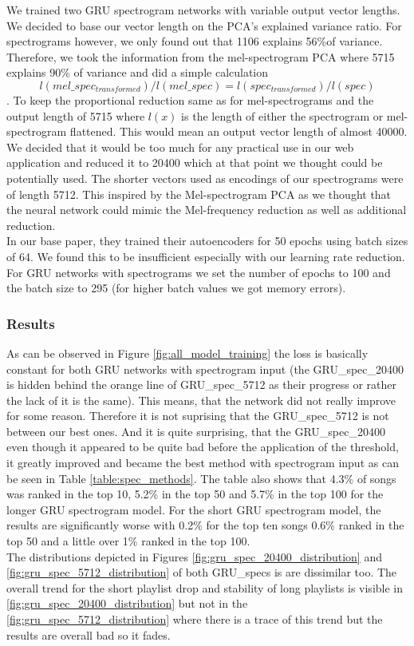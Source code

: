 We trained two GRU spectrogram networks with variable output vector lengths. We decided to base our vector length on the PCA's explained variance ratio. For spectrograms however, we only found out that 1106 explains 56\%of variance. Therefore, we took the information from the mel-spectrogram PCA where 5715 explains 90\% of variance and did a simple calculation $$ l(mel\_spec_{transformed})/l(mel\_spec) = l(spec_{transformed})/l(spec) $$. To keep the proportional reduction same as for mel-spectrograms and the output length of 5715 where $l(x)$ is the length of either the spectrogram or mel-spectrogram flattened. This would mean an output vector length of almost 40000. We decided that it would be too much for any practical use in our web application and reduced it to 20400 which at that point we thought could be potentially used. The shorter vectors used as encodings of our spectrograms were of length 5712. This inspired by the Mel-spectrogram PCA as we thought that the neural network could mimic the Mel-frequency reduction as well as additional reduction. \\
In our base paper, they trained their autoencoders for 50 epochs using batch sizes of 64. We found this to be insufficient especially with our learning rate reduction. For GRU networks with spectrograms we set the number of epochs to 100 and the batch size to 295 (for higher batch values we got memory errors). 

\subsubsection{Results}
As can be observed in Figure \ref{fig:all_model_training} the loss is basically constant for both GRU networks with spectrogram input (the GRU\_spec\_20400 is hidden behind the orange line of GRU\_spec\_5712 as their progress or rather the lack of it is the same). This means, that the network did not really improve for some reason. Therefore it is not suprising that the GRU\_spec\_5712 is not between our best ones. And it is quite surprising, that the GRU\_spec\_20400 even though it appeared to be quite bad before the application of the threshold, it greatly improved and became the best method with spectrogram input as can be seen in Table \ref{table:spec_methods}. The table also shows that 4.3\% of songs was ranked in the top 10, 5.2\% in the top 50 and 5.7\% in the top 100 for the longer GRU spectrogram model. For the short GRU spectrogram model, the results are significantly worse with 0.2\% for the top ten songs 0.6\% ranked in the top 50 and a little over 1\% ranked in the top 100. \\
The distributions depicted in Figures \ref{fig:gru_spec_20400_distribution} and \ref{fig:gru_spec_5712_distribution} of both GRU\_specs is are dissimilar too. The overall trend for the short playlist drop and stability of long playlists is visible in \ref{fig:gru_spec_20400_distribution} but not in the \ref{fig:gru_spec_5712_distribution} where there is a trace of this trend but the results are overall bad so it fades. 

